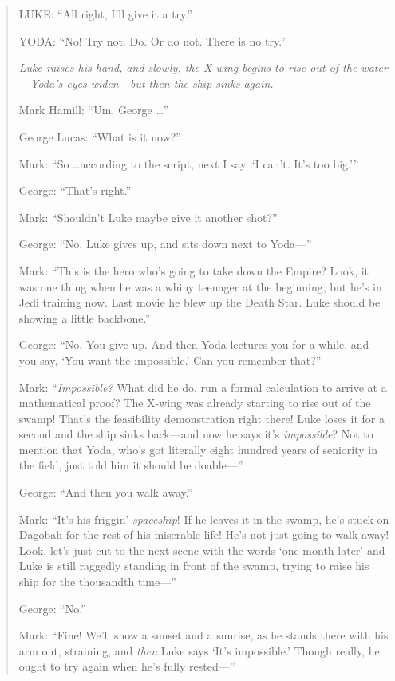 \begin{quotation}
{
 LUKE: ``All right, I'll give it a
try.''}

{
 YODA: ``No! Try not. Do. Or do not. There is no
try.''}

{
 \textit{Luke raises his hand, and slowly, the X-wing begins to
rise out of the water---Yoda's eyes widen---but then
the ship sinks again.}}

{
 Mark Hamill: ``Um, George
\ldots''}

{
 George Lucas: ``What is it
now?''}

{
 Mark: ``So \ldots according to the script, next I
say, `I can't. It's too
big.'''}

{
 George: ``That's
right.''}

{
 Mark: ``Shouldn't Luke maybe give
it another shot?''}

{
 George: ``No. Luke gives up, and sits down next
to Yoda---''}

{
 Mark: ``This is the hero who's
going to take down the Empire? Look, it was one thing when he was a
whiny teenager at the beginning, but he's in Jedi
training now. Last movie he blew up the Death Star. Luke should be
showing a little backbone.''}

{
 George: ``No. You give up. And then Yoda lectures
you for a while, and you say, `You want the
impossible.' Can you remember
that?''}

{
 Mark: ``\textit{Impossible?} What did he do, run
a formal calculation to arrive at a mathematical proof? The X-wing was
already starting to rise out of the swamp! That's the
feasibility demonstration right there! Luke loses it for a second and
the ship sinks back---and now he says it's
\textit{impossible}? Not to mention that Yoda, who's
got literally eight hundred years of seniority in the field, just told
him it should be doable---''}

{
 George: ``And then you walk
away.''}

{
 Mark: ``It's his
friggin' \textit{spaceship}! If he leaves it in the
swamp, he's stuck on Dagobah for the rest of his
miserable life! He's not just going to walk away! Look,
let's just cut to the next scene with the words
`one month later' and Luke is still
raggedly standing in front of the swamp, trying to raise his ship for
the thousandth time---''}

{
 George: ``No.''}

{
 Mark: ``Fine! We'll show a sunset
and a sunrise, as he stands there with his arm out, straining, and
\textit{then} Luke says `It's
impossible.' Though really, he ought to try again when
he's fully rested---''}


\end{quotation}
